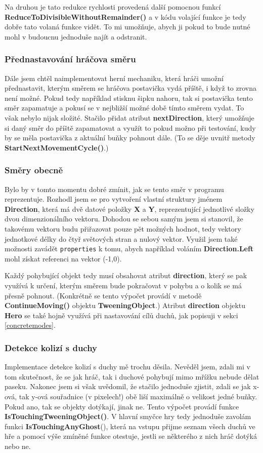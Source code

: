 \documentclass[a4]{article}
\begin{document}
Na druhou je tato redukce rychlosti provedená další pomocnou funkcí \textbf{ReduceToDivisibleWithoutRemainder()} a v kódu volající funkce je tedy dobře tato volaná funkce vidět. To mi umožňuje, abych ji pokud to bude nutné mohl v budoucnu jednoduše najít a odstranit.
\subsubsection{Přednastavování hráčova směru}
Dále jsem chtěl naimplementovat herní mechaniku, která hráči umožní přednastavit, kterým směrem se hráčova postavička vydá příště, i když to zrovna není možné. Pokud tedy například stisknu šipku nahoru, tak si postavička tento směr zapamatuje a pokusí se v nejbližší možné době tímto směrem vydat. To však nebylo nijak složité. Stačilo přidat atribut \textbf{nextDirection}, který umožňuje si daný směr do příště zapamatovat a využít to pokud možno při testování, kudy by se měla postavička z aktuální buňky pohnout dále. (To se děje uvnitř metody \textbf{StartNextMovementCycle()}.)
\subsubsection{Směry obecně} \label{directions}
Bylo by v tomto momentu dobré zmínit, jak se tento směr v programu reprezentuje. Rozhodl jsem se pro vytvoření vlastní struktury jménem \textbf{Direction}, která má dvě datové položky \textbf{X} a \textbf{Y}, reprezentující jednotlivé složky dvou dimenzionálního vektoru. Dohodou se sebou samým jsem si stanovil, že takovému vektoru budu přiřazovat pouze pět možných hodnot, tedy vektory jednotkové délky do čtyř světových stran a nulový vektor. Využil jsem také možnosti zavádět \verb|properties| k tomu, abych například voláním \textbf{Direction.Left} mohl získat referenci na vektor (-1,0).

Každý pohybující objekt tedy musí obsahovat atribut \textbf{direction}, který se pak využívá k určení, kterým směrem bude pokračovat v pohybu a o kolik se má přesně pohnout. (Konkrétně se tento výpočet provádí v metodě \textbf{ContinueMoving()} objektu \textbf{TweeningObject}.) Atribut \textbf{direction} objektu \textbf{Hero} se také hojně využívá při nastavování cílů duchů, jak popisuji v sekci \ref{concretemodes}.
\subsubsection{Detekce kolizí s duchy} \label{collisiondetection}
Implementace detekce kolizí s duchy mě trochu děsila. Nevěděl jsem, zdali mi v tom skutečnost, že se jak hráč, tak i duchové pohybují mimo mřížku nebude dělat paseku. Nakonec jsem si však uvědomil, že stačilo jednoduše zjistit, zdali se jak x-ová, tak y-ová souřadnice (v pixelech!) obě liší maximálně o velikost jedné buňky. Pokud ano, tak se objekty dotýkají, jinak ne. Tento výpočet provádí funkce \textbf{IsTouchingTweeningObject()}. V hlavní smyčce hry tedy jednoduše zavolám funkci \textbf{IsTouchingAnyGhost}(), která na vstupu přijme seznam všech duchů ve hře a pomocí výše zmíněné funkce otestuje, jestli se některého z nich hráč dotýká nebo ne.
\end{document}
